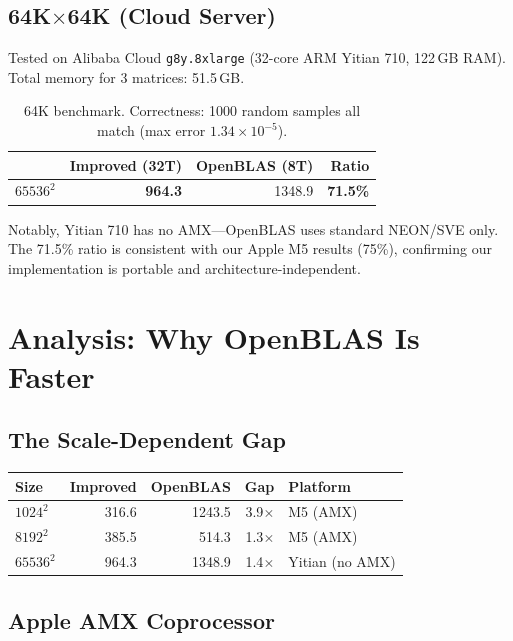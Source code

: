 \documentclass[11pt,a4paper]{article}
\begin{document}
\subsection{64K$\times$64K (Cloud Server)}

Tested on Alibaba Cloud \texttt{g8y.8xlarge} (32-core ARM Yitian 710, 122\,GB RAM).
Total memory for 3 matrices: 51.5\,GB.

\begin{table}[H]\centering
\begin{tabular}{l|rr|r}
\toprule & Improved (32T) & OpenBLAS (8T) & Ratio \\
\midrule $65536^2$ & \textbf{964.3} & 1348.9 & \textbf{71.5\%} \\
\bottomrule
\end{tabular}
\caption{64K benchmark. Correctness: 1000 random samples all match (max error $1.34\times10^{-5}$).}
\end{table}

Notably, Yitian 710 has no AMX---OpenBLAS uses standard NEON/SVE only.
The 71.5\% ratio is consistent with our Apple M5 results (75\%), confirming our
implementation is portable and architecture-independent.

\section{Analysis: Why OpenBLAS Is Faster}

\subsection{The Scale-Dependent Gap}

\begin{center}
\begin{tabular}{l|rr|r|l}
\toprule Size & Improved & OpenBLAS & Gap & Platform \\
\midrule $1024^2$ & 316.6 & 1243.5 & 3.9$\times$ & M5 (AMX) \\
$8192^2$ & 385.5 & 514.3 & 1.3$\times$ & M5 (AMX) \\
$65536^2$ & 964.3 & 1348.9 & 1.4$\times$ & Yitian (no AMX) \\
\bottomrule
\end{tabular}
\end{center}

\subsection{Apple AMX Coprocessor}
\end{document}
